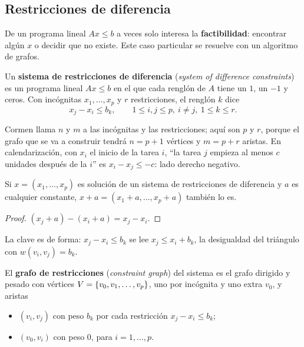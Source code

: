 \documentclass[11pt,letterpaper]{article}
\begin{document}

\subsection*{Restricciones de diferencia}

De un programa lineal $Ax \le b$ a veces solo interesa la
\textbf{factibilidad}: encontrar algún $x$ o decidir que no existe.
Este caso particular se resuelve con un algoritmo de grafos.

\begin{definicion}
  \label{def:restricciones-diferencia}
  Un \textbf{sistema de restricciones de diferencia} (\textit{system
  of difference constraints}) es un programa lineal $Ax \le b$ en el
  que cada renglón de $A$ tiene un $1$, un $-1$ y ceros. Con
  incógnitas $x_1, \dots, x_p$ y $r$ restricciones, el renglón $k$
  dice
  \[
    x_j - x_i \le b_k , \qquad 1 \le i, j \le p,\ i \neq j,\
    1 \le k \le r .
  \]
\end{definicion}

Cormen llama $n$ y $m$ a las incógnitas y las restricciones; aquí son
$p$ y $r$, porque el grafo que se va a construir tendrá $n = p + 1$
vértices y $m = p + r$ aristas. En calendarización, con $x_i$ el
inicio de la tarea $i$, ``la tarea $j$ empieza al menos $c$ unidades
después de la $i$'' es $x_i - x_j \le -c$: lado derecho negativo.

\begin{lema}
  \label{lem:traslacion-restricciones}
  Si $x = (x_1, \dots, x_p)$ es solución de un sistema de
  restricciones de diferencia y $a$ es cualquier constante,
  $x + a = (x_1 + a, \dots, x_p + a)$ también lo es.
\end{lema}

\begin{proof}
  $(x_j + a) - (x_i + a) = x_j - x_i$.
\end{proof}

La clave es de forma: $x_j - x_i \le b_k$ se lee
$x_j \le x_i + b_k$, la desigualdad del triángulo con
$w(v_i, v_j) = b_k$.

\begin{definicion}
  \label{def:grafo-restricciones}
  El \textbf{grafo de restricciones} (\textit{constraint graph}) del
  sistema es el grafo dirigido y pesado con vértices
  $V = \left\{ v_0, v_1, \dots, v_p \right\}$, uno por incógnita y uno extra
  $v_0$, y aristas
  \begin{itemize}[itemsep=0.1em]
    \item $(v_i, v_j)$ con peso $b_k$ por cada restricción
          $x_j - x_i \le b_k$;
    \item $(v_0, v_i)$ con peso $0$, para $i = 1, \dots, p$.
  \end{itemize}
\end{definicion}
\end{document}
